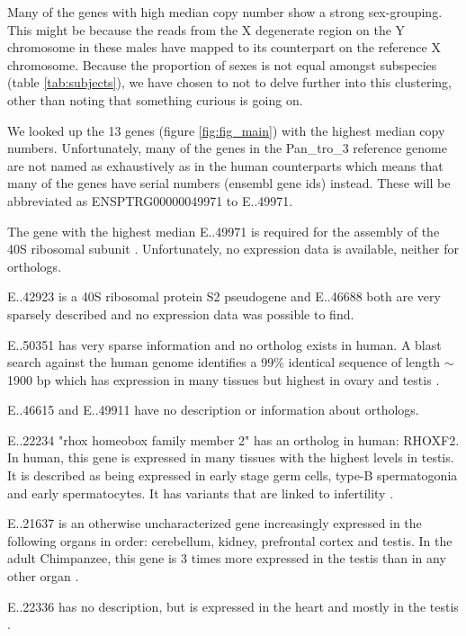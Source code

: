 Many of the genes with high median copy number show a strong sex-grouping. This might be because the reads from the X degenerate region on the Y chromosome\cite{skaletsklyMSY} in these males have mapped to its counterpart on the reference X chromosome. Because the proportion of sexes is not equal amongst subspecies (table \ref{tab:subjects}), we have chosen to not to delve further into this clustering, other than noting that something curious is going on. 

We looked up the 13 genes (figure \ref{fig:fig_main}) with the highest median copy numbers. Unfortunately, many of the genes in the Pan\_tro\_3 reference genome are not named as exhaustively as in the human counterparts which means that many of the genes have serial numbers (ensembl gene ids) instead. These will be abbreviated as ENSPTRG00000049971 to E..49971. 

The gene with the highest median \noindent E..49971 is required for the assembly of the 40S ribosomal subunit \cite{ensembl}. Unfortunately, no expression data is available, neither for orthologs.

E..42923 is a 40S ribosomal protein S2 pseudogene and E..46688 both are very sparsely described \cite{ensembl} and no expression data was possible to find.

E..50351 has very sparse information and no ortholog exists in human. A blast search against the human genome identifies a 99\% identical sequence of length $\sim$ 1900 bp which has expression in many tissues but highest in ovary and testis \cite{ensembl}. 

E..46615 and E..49911 have no description or information about orthologs.


E..22234 "rhox homeobox family member 2" has an ortholog in human: RHOXF2. In human, this gene is expressed in many tissues with the highest levels in testis. It is described as being expressed in early stage germ cells, type-B spermatogonia and early spermatocytes. It has variants that are linked to infertility \cite{10.1093/hmg/ddw313}.

E..21637 is an otherwise uncharacterized gene increasingly expressed in the following organs in order: cerebellum, kidney, prefrontal cortex and testis. In the adult Chimpanzee, this gene is 3 times more expressed in the testis than in any other organ \cite{bgee_}.


E..22336 has no description, but is expressed in the heart and mostly in the testis \cite{bgee_}.



